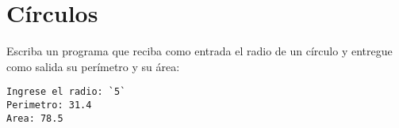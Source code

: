 \section{Círculos}

Escriba un programa que reciba como entrada el radio de un círculo y
entregue como salida su perímetro y su área:

\begin{lstlisting}[language=testcase]
Ingrese el radio: `5`
Perimetro: 31.4
Area: 78.5
\end{lstlisting}
